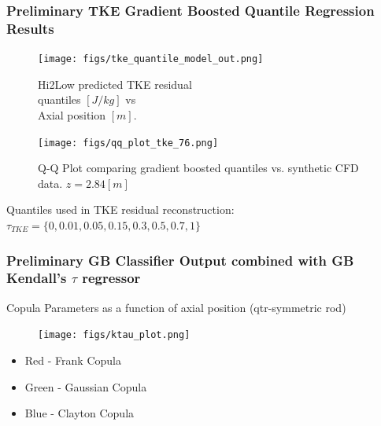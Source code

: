 \documentclass[t, pdftex]{beamer}
\begin{document}
\begin{frame}\frametitle{\small Preliminary TKE Gradient Boosted Quantile Regression Results}
    \begin{figure}
        \centering
        \begin{minipage}{.5\textwidth}
            \centering
            \texttt{[image: figs/tke\_quantile\_model\_out.png]}
            \caption{Hi2Low predicted TKE residual \\ quantiles $[J/kg]$ vs \\ Axial position $[m]$.}
        \end{minipage}%
        \begin{minipage}{.5\textwidth}
            \centering
            \texttt{[image: figs/qq\_plot\_tke\_76.png]}
            \caption{Q-Q Plot comparing gradient boosted quantiles vs. synthetic CFD data. $z=2.84[m]$}
        \end{minipage}
    \end{figure}
Quantiles used in TKE residual reconstruction: $\tau_{TKE}=\{0, 0.01, 0.05, 0.15, 0.3, 0.5, 0.7, 1\}$
\end{frame}


\begin{frame}\frametitle{\small Preliminary GB Classifier Output combined with GB Kendall's $\tau$ regressor}
\tiny Copula Parameters as a function of axial position (qtr-symmetric rod)
\begin{figure}[!htbp]
\centering
\texttt{[image: figs/ktau\_plot.png]}
\label{model_overview}
\end{figure}
\begin{itemize}
\item {\color{red} Red - Frank Copula}
\item {\color{green} Green - Gaussian Copula}
\item {\color{blue} Blue - Clayton Copula}
\end{itemize}
\end{frame}


\end{document}
